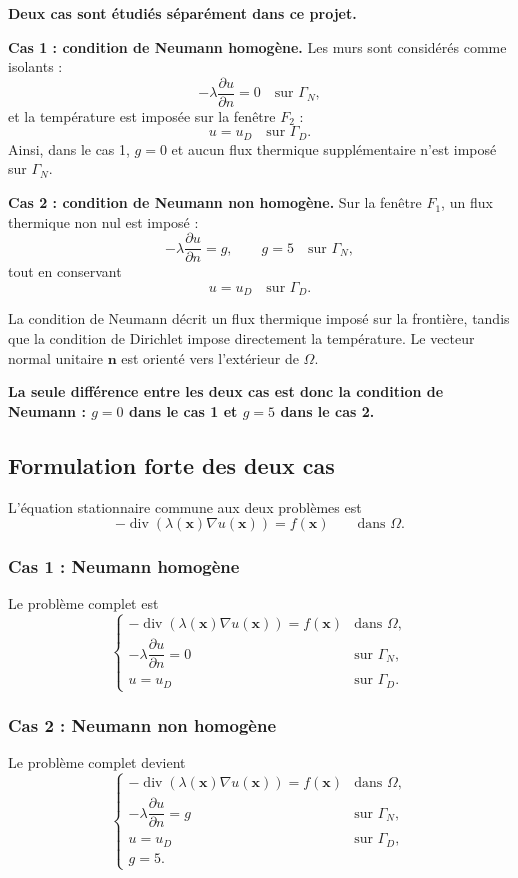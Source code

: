 \documentclass[12pt,a4paper]{article}
\begin{document}
	\textbf{Deux cas sont étudiés séparément dans ce projet.}
	
	\textbf{Cas 1 : condition de Neumann homogène.} Les murs sont considérés comme isolants :
	\[
	-\lambda\frac{\partial u}{\partial n}=0\quad\text{sur }\Gamma_N,
	\]
	et la température est imposée sur la fenêtre $F_2$ :
	\[
	u=u_D\quad\text{sur }\Gamma_D.
	\]
	Ainsi, dans le cas 1, $g=0$ et aucun flux thermique supplémentaire n'est imposé sur $\Gamma_N$.
	
	\textbf{Cas 2 : condition de Neumann non homogène.} Sur la fenêtre $F_1$, un flux thermique non nul est imposé :
	\[
	-\lambda\frac{\partial u}{\partial n}=g,\qquad g=5\quad\text{sur }\Gamma_N,
	\]
	tout en conservant
	\[
	u=u_D\quad\text{sur }\Gamma_D.
	\]
	
	La condition de Neumann décrit un flux thermique imposé sur la frontière, tandis que la condition de Dirichlet impose directement la température. Le vecteur normal unitaire $\mathbf n$ est orienté vers l'extérieur de $\Omega$.
	
	\textbf{La seule différence entre les deux cas est donc la condition de Neumann : $g=0$ dans le cas 1 et $g=5$ dans le cas 2.}
	
	\subsection{Formulation forte des deux cas}
	L'équation stationnaire commune aux deux problèmes est
	\[
	-\operatorname{div}(\lambda(\mathbf{x})\nabla u(\mathbf{x}))=f(\mathbf{x})
	\qquad\text{dans }\Omega.
	\]
	
	\subsubsection{Cas 1 : Neumann homogène}
	Le problème complet est
	\begin{equation}
		\label{eq:forte-cas1}
		\begin{cases}
			-\operatorname{div}(\lambda(\mathbf{x})\nabla u(\mathbf{x}))=f(\mathbf{x}) & \text{dans }\Omega,\\
			-\lambda\dfrac{\partial u}{\partial n}=0 & \text{sur }\Gamma_N,\\
			u=u_D & \text{sur }\Gamma_D.
		\end{cases}
	\end{equation}
	
	\subsubsection{Cas 2 : Neumann non homogène}
	Le problème complet devient
	\begin{equation}
		\label{eq:forte-cas2}
		\begin{cases}
			-\operatorname{div}(\lambda(\mathbf{x})\nabla u(\mathbf{x}))=f(\mathbf{x}) & \text{dans }\Omega,\\
			-\lambda\dfrac{\partial u}{\partial n}=g & \text{sur }\Gamma_N,\\
			u=u_D & \text{sur }\Gamma_D,\\
			g=5.
		\end{cases}
	\end{equation}
	
\end{document}
